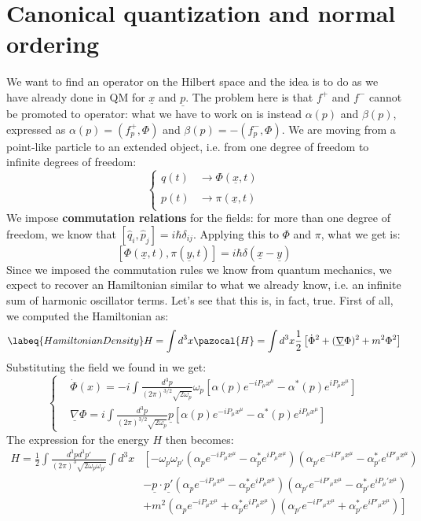 \documentclass[../main.tex]{subfiles}
\begin{document}
\section{Canonical quantization and normal ordering}
We want to find an operator on the Hilbert space and the idea is to do as we have already done in QM for $\underline{x}$ and $\underline{p}$. The problem here is that $f^+$ and $f^-$ cannot be promoted to operator: what we have to work on is instead $\alpha(p)$ and $\beta(p)$, expressed as $\alpha(p)=(f^+_p,\Phi)$ and $\beta(p)=-(f^-_p,\Phi)$. We are moving from a point-like particle to an extended object, i.e. from one degree of freedom to infinite degrees of freedom:
\[
\left\{
\begin{aligned}
q(t)&\xrightarrow[]{}\Phi(\underline{x},t)\\
p(t)&\xrightarrow[]{}\pi(\underline{x},t)
\end{aligned}
\right.
\]
We impose \textbf{commutation relations} for the fields: for more than one degree of freedom, we know that $[\hat{q}_i,\hat{p}_j]=i\hbar\delta_{ij}$. Applying this to $\Phi$ and $\pi$, what we get is:
\[
[\Phi(\underline{x},t),\pi(\underline{y},t)]=i\hbar\delta(\underline{x}-\underline{y})
\]
Since we imposed the commutation rules we know from quantum mechanics, we expect to recover an Hamiltonian similar to what we already know, i.e. an infinite sum of harmonic oscillator terms. Let's see that this is, in fact, true. First of all, we computed the Hamiltonian as:
\begin{equation}
\labeq{HamiltonianDensity}
H=\int d^3x\pazocal{H}=\int d^3x\frac{1}{2}\left[\Dot{\Phi}^2+(\underline{\nabla}\Phi)^2+m^2\Phi^2\right]
\end{equation}
Substituting the field we found in  we get:
\[
\left\{
\begin{aligned}
&\Dot{\Phi}(x)=-i\int\frac{d^3p}{(2\pi)^{3/2}\sqrt{2\omega_p}}\omega_p[\alpha(p)e^{-iP_\mu x^\mu}-\alpha^*(p)e^{iP_\mu x^\mu}]\\
&\underline{\nabla}\Phi=i\int\frac{d^3p}{(2\pi)^{3/2}\sqrt{2\omega_p}}\underline{p}[\alpha(p)e^{-iP_\mu x^\mu}-\alpha^*(p)e^{iP_\mu x^\mu}]
\end{aligned}
\right.
\]
The expression for the energy $H$ then becomes:
\begin{align*}
    H=\frac{1}{2}\int \frac{d^3pd^3p'}{(2\pi)^3\sqrt{2\omega_p\omega_{p'}}}\int d^3x&\left[-\omega_p\omega_{p'}(\alpha_pe^{-iP_\mu x^\mu}-\alpha^*_pe^{iP_\mu x^\mu})(\alpha_{p'}e^{-iP'_\mu x^\mu}-\alpha^*_{p'}e^{iP'_\mu x^\mu})\right.\\
    &-\underline{p}\cdot\underline{p'}(\alpha_pe^{-iP_\mu x^\mu}-\alpha^*_pe^{iP_\mu x^\mu})(\alpha_{p'}e^{-iP'_\mu x^\mu}-\alpha^*_{p'}e^{iP_\mu 'x^\mu})\\
    &\left.+m^2(\alpha_pe^{-iP_\mu x^\mu}+\alpha^*_pe^{iP_\mu x^\mu})(\alpha_{p'}e^{-iP'_\mu x^\mu}+\alpha^*_{p'}e^{iP'_\mu x^\mu})\right]
\end{align*}
\end{document}

